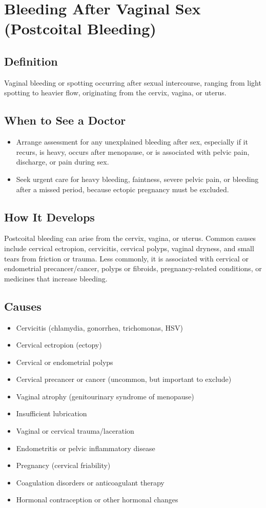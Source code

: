 \chapter{Bleeding After Vaginal Sex (Postcoital Bleeding)}

\section*{Definition}
Vaginal bleeding or spotting occurring after sexual intercourse, ranging from light spotting to heavier flow, originating from the cervix, vagina, or uterus.

\section*{When to See a Doctor}

\begin{itemize}
 \item Arrange assessment for any unexplained bleeding after sex, especially if it recurs, is heavy, occurs after menopause, or is associated with pelvic pain, discharge, or pain during sex.
 \item Seek urgent care for heavy bleeding, faintness, severe pelvic pain, or bleeding after a missed period, because ectopic pregnancy must be excluded.
\end{itemize}

\section*{How It Develops}
Postcoital bleeding can arise from the cervix, vagina, or uterus. Common causes include cervical ectropion, cervicitis, cervical polyps, vaginal dryness, and small tears from friction or trauma. Less commonly, it is associated with cervical or endometrial precancer/cancer, polyps or fibroids, pregnancy-related conditions, or medicines that increase bleeding.

\section*{Causes}
\begin{itemize}
 \item Cervicitis (chlamydia, gonorrhea, trichomonas, HSV)
 \item Cervical ectropion (ectopy)
 \item Cervical or endometrial polyps
 \item Cervical precancer or cancer (uncommon, but important to exclude)
 \item Vaginal atrophy (genitourinary syndrome of menopause)
 \item Insufficient lubrication
 \item Vaginal or cervical trauma/laceration
 \item Endometritis or pelvic inflammatory disease
 \item Pregnancy (cervical friability)
 \item Coagulation disorders or anticoagulant therapy
 \item Hormonal contraception or other hormonal changes
\end{itemize}

